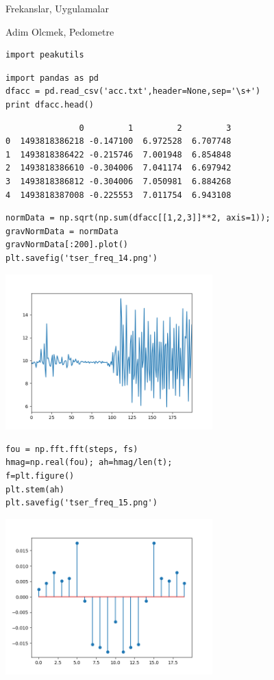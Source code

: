 \documentclass[12pt,fleqn]{article}\usepackage{../../common}
\begin{document}
Frekanslar, Uygulamalar

Adim Olcmek, Pedometre

\begin{verbatim}
import peakutils
\end{verbatim}


\begin{verbatim}
import pandas as pd
dfacc = pd.read_csv('acc.txt',header=None,sep='\s+')
print dfacc.head()
\end{verbatim}

\begin{verbatim}
               0         1         2         3
0  1493818386218 -0.147100  6.972528  6.707748
1  1493818386422 -0.215746  7.001948  6.854848
2  1493818386610 -0.304006  7.041174  6.697942
3  1493818386812 -0.304006  7.050981  6.884268
4  1493818387008 -0.225553  7.011754  6.943108
\end{verbatim}

\begin{verbatim}
normData = np.sqrt(np.sum(dfacc[[1,2,3]]**2, axis=1));
gravNormData = normData 
gravNormData[:200].plot()
plt.savefig('tser_freq_14.png')
\end{verbatim}

\includegraphics[height=6cm]{tser_freq_14.png}

\begin{verbatim}
fou = np.fft.fft(steps, fs)
hmag=np.real(fou); ah=hmag/len(t);
f=plt.figure()
plt.stem(ah)
plt.savefig('tser_freq_15.png')
\end{verbatim}

\includegraphics[height=6cm]{tser_freq_15.png}
\end{document}
